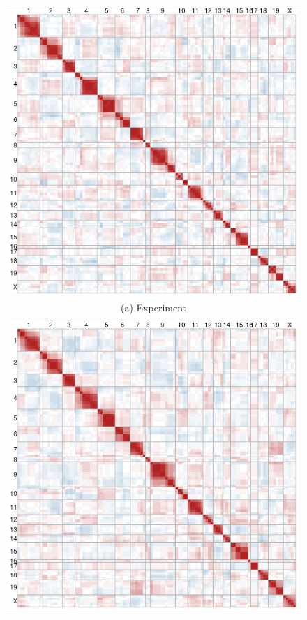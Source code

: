 \documentclass[sts]{imsart}
\begin{document}
\begin{figure}[h!]
  \begin{center}
    \begin{tabular}{c}
      \includegraphics[scale = 0.3]{../img/uclabsb.png} \\
      {\footnotesize (a) Experiment} \\
      \\
      \includegraphics[scale = 0.3]{../img/uclabsb_sim.png} \\

\end{tabular}
\end{center}
\end{figure}
\end{document}
